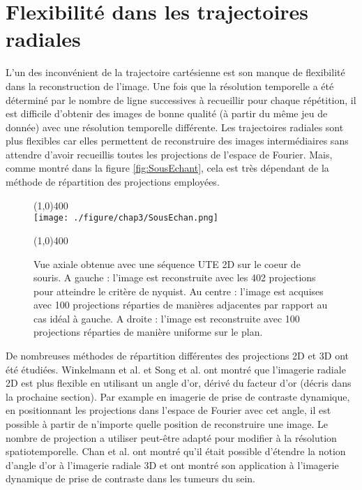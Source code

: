 \section{Flexibilité dans les trajectoires radiales}

L'un des inconvénient de la trajectoire cartésienne est son manque de flexibilité dans la reconstruction de l'image. Une fois que la résolution temporelle a été déterminé par le nombre de ligne successives à recueillir pour chaque répétition, il est difficile d'obtenir des images de bonne qualité (à partir du même jeu de donnée) avec une résolution temporelle différente.
Les trajectoires radiales sont plus flexibles car elles permettent de reconstruire des images intermédiaires sans attendre d'avoir recueillis toutes les projections de l'espace de Fourier. Mais, comme montré dans la figure \ref{fig:SousEchant}, cela est très dépendant de la méthode de répartition des projections employées.
\begin{figure}[H]
\centering
\line(1,0){400} \\
\texttt{[image: ./figure/chap3/SousEchan.png]}
\caption[Sous-échantillonnage]{\label{fig:SousEchan} Vue axiale obtenue avec une séquence UTE 2D sur le coeur de souris. A gauche : l'image est reconstruite avec les 402 projections pour atteindre le critère de nyquist. Au centre : l'image est acquises avec 100 projections réparties de manières adjacentes par rapport au cas idéal à gauche. A droite : l'image est reconstruite avec 100 projections réparties de manière uniforme sur le plan.}
\line(1,0){400} \\ \end{figure}
De nombreuses méthodes de répartition différentes des projections 2D et 3D ont été étudiées. Winkelmann et al. \cite{Winkelmann:2007fk} et Song et al. \cite{Song:2000fk} ont montré que l'imagerie radiale 2D est plus flexible en utilisant un angle d'or, dérivé du facteur d'or (décris dans la prochaine section). Par example en imagerie de prise de contraste dynamique, en positionnant les projections dans l'espace de Fourier avec cet angle, il est possible à partir de n'importe quelle position de reconstruire une image. Le nombre de projection a utiliser peut-être adapté pour modifier à la résolution spatiotemporelle. Chan et al. \cite{Chan:2009uq} ont montré qu'il était possible d'étendre la notion d'angle d'or à l'imagerie radiale 3D et ont montré son application à l'imagerie dynamique de prise de contraste dans les tumeurs du sein.

